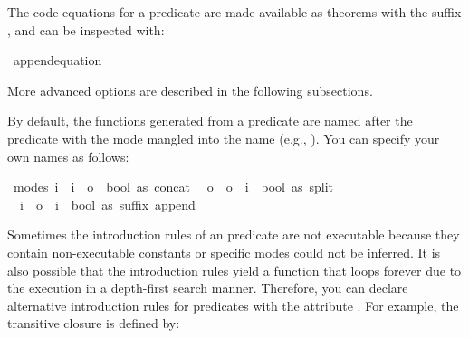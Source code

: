 \begin{isabellebody}
\begin{isamarkuptext}
The code equations for a predicate are made available as theorems with
 the suffix , and can be inspected with:%
\end{isamarkuptext}%
\isamarkuptrue%
%
\isadelimquote
%
\endisadelimquote
%
\isatagquote
{}\isamarkupfalse%
\ append{\isachardot}equation%
\endisatagquote
{\isafoldquote}%
%
\isadelimquote
%
\endisadelimquote
%
\begin{isamarkuptext}%
\noindent More advanced options are described in the following subsections.%
\end{isamarkuptext}%
\isamarkuptrue%
%
\isamarkuptrue%
%
\begin{isamarkuptext}%
By default, the functions generated from a predicate are named after the predicate with the
mode mangled into the name (e.g., ).
You can specify your own names as follows:%
\end{isamarkuptext}%
\isamarkuptrue%
%
\isadelimquote
%
\endisadelimquote
%
\isatagquote
{}\isamarkupfalse%
\ {\isacharparenleft}modes{\isacharcolon}\ i\ {\isacharequal}{\isachargreater}\ i\ {\isacharequal}{\isachargreater}\ o\ {\isacharequal}{\isachargreater}\ bool\ as\ concat{\isacharcomma}\isanewline
\ \ o\ {\isacharequal}{\isachargreater}\ o\ {\isacharequal}{\isachargreater}\ i\ {\isacharequal}{\isachargreater}\ bool\ as\ split{\isacharcomma}\isanewline
\ \ i\ {\isacharequal}{\isachargreater}\ o\ {\isacharequal}{\isachargreater}\ i\ {\isacharequal}{\isachargreater}\ bool\ as\ suffix{\isacharparenright}\ append\ \isacommand{{\isachardot}}\isamarkupfalse%
%
\endisatagquote
{\isafoldquote}%
%
\isadelimquote
%
\endisadelimquote
%
\isamarkuptrue%
%
\begin{isamarkuptext}%
Sometimes the introduction rules of an predicate are not executable because they contain
non-executable constants or specific modes could not be inferred.
It is also possible that the introduction rules yield a function that loops forever
due to the execution in a depth-first search manner.
Therefore, you can declare alternative introduction rules for predicates with the attribute
\hyperlink{attribute.code-pred-intro}{\mbox{}}.
For example, the transitive closure is defined by:%
\end{isamarkuptext}%
\isamarkuptrue%
%
\isadelimquote
%
\endisadelimquote

\end{isabellebody}
